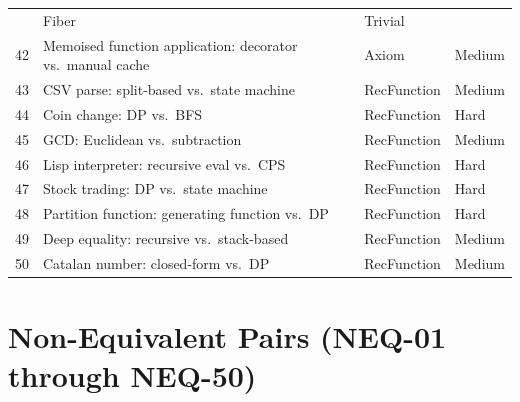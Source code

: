 \documentclass[11pt,a4paper]{report}
\theoremstyle{definition}
\theoremstyle{plain}
\begin{document}
\begin{center}
\begin{tabular}{r p{5.5cm} l l}
     & Fiber & Trivial \\
  42 & Memoised function application: decorator vs.\ manual cache
     & Axiom & Medium \\
  43 & CSV parse: split-based vs.\ state machine
     & RecFunction & Medium \\
  44 & Coin change: DP vs.\ BFS
     & RecFunction & Hard \\
  45 & GCD: Euclidean vs.\ subtraction
     & RecFunction & Medium \\
  46 & Lisp interpreter: recursive eval vs.\ CPS
     & RecFunction & Hard \\
  47 & Stock trading: DP vs.\ state machine
     & RecFunction & Hard \\
  48 & Partition function: generating function vs.\ DP
     & RecFunction & Hard \\
  49 & Deep equality: recursive vs.\ stack-based
     & RecFunction & Medium \\
  50 & Catalan number: closed-form vs.\ DP
     & RecFunction & Medium \\
\end{tabular}
\end{center}

\section{Non-Equivalent Pairs (NEQ-01 through NEQ-50)}
\end{document}
